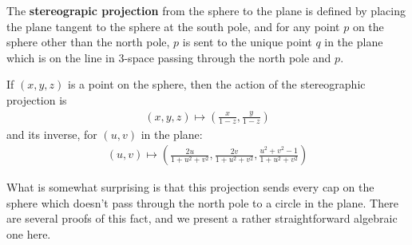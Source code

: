
\begin{definition}
  The \textbf{stereograpic projection} from the sphere to the plane is
  defined by placing the plane tangent to the sphere at the south
  pole, and for any point $p$ on the sphere other than the north pole,
  $p$ is sent to the unique point $q$ in the plane which is on the
  line in 3-space passing through the north pole and $p$.

  If $(x,y,z)$ is a point on the sphere, then the action of the
  stereographic projection is
  \begin{align*}
    (x,y,z)\mapsto \left(\frac{x}{1-z},\frac{y}{1-z}\right)
  \end{align*}
  and its inverse, for $(u,v)$ in the plane:
  \begin{align*}
    (u,v)\mapsto \left( \frac{2u}{1+u^2+v^2},\frac{2v}{1+u^2+v^2},
    \frac{u^2+v^2-1}{1+u^2+v^2}   \right)
  \end{align*}
\end{definition}

What is somewhat surprising is that this projection sends every cap on
the sphere which doesn't pass through the north pole to a circle in
the plane.  There are several proofs of this fact, and we present
a rather straightforward algebraic one here.

